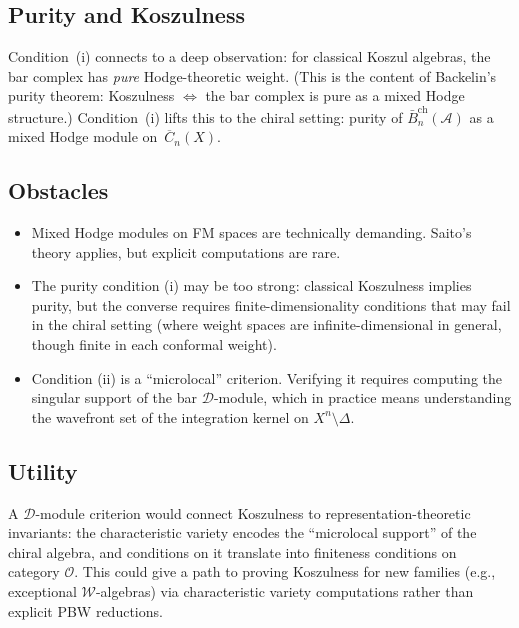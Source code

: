 \documentclass[11pt]{article}
\newcommand{\cA}{\mathcal{A}}
\newcommand{\cD}{\mathcal{D}}
\newcommand{\cO}{\mathcal{O}}
\newcommand{\barB}{\bar{B}}
\theoremstyle{plain}
\theoremstyle{definition}
\theoremstyle{remark}
\begin{document}
\subsection{Purity and Koszulness}

Condition~(i) connects to a deep observation: for classical
Koszul algebras, the bar complex has \emph{pure} Hodge-theoretic
weight.  (This is the content of Backelin's purity theorem:
Koszulness $\Leftrightarrow$ the bar complex is pure as a mixed
Hodge structure.)  Condition~(i) lifts this to the chiral
setting: purity of $\barB_n^{\mathrm{ch}}(\cA)$ as a mixed
Hodge module on~$\overline{C}_n(X)$.

\subsection{Obstacles}

\begin{itemize}
\item Mixed Hodge modules on FM spaces are technically demanding.
  Saito's theory applies, but explicit computations are rare.
\item The purity condition (i) may be too strong: classical
  Koszulness implies purity, but the converse requires
  finite-dimensionality conditions that may fail in the
  chiral setting (where weight spaces are infinite-dimensional
  in general, though finite in each conformal weight).
\item Condition (ii) is a ``microlocal'' criterion.  Verifying
  it requires computing the singular support of the bar
  $\cD$-module, which in practice means understanding the
  wavefront set of the integration kernel on $X^n \setminus
  \Delta$.
\end{itemize}

\subsection{Utility}

A $\cD$-module criterion would connect Koszulness to
representation-theoretic invariants: the characteristic variety
encodes the ``microlocal support'' of the chiral algebra, and
conditions on it translate into finiteness conditions on category
$\cO$.  This could give a path to proving Koszulness for new
families (e.g., exceptional $\mathcal{W}$-algebras) via
characteristic variety computations rather than explicit PBW
reductions.


\end{document}
